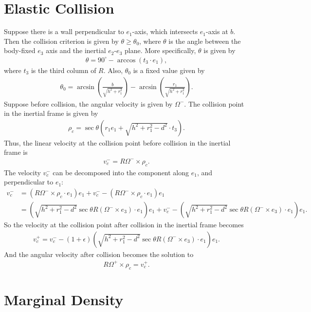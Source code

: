 \documentclass[10pt]{article}
\begin{document}
\section{Elastic Collision}
Suppose there is a wall perpendicular to $e_1$-axis, which intersects $e_1$-axis at $b$.
Then the collision criterion is given by $\theta \geq \theta_0$, where $\theta$ is the angle between the body-fixed $e_3$ axis and the inertial $e_2$-$e_3$ plane.
More specifically, $\theta$ is given by
\begin{align}
	\theta = 90^\circ - \arccos(t_3 \cdot e_1),
\end{align}
where $t_3$ is the third column of $R$.
Also, $\theta_0$ is a fixed value given by
\begin{align}
	\theta_0 = \arcsin\left(\frac{b}{\sqrt{h^2+r_1^2}}\right) - \arcsin\left(\frac{r_1}{\sqrt{h^2+r_1^2}}\right).
\end{align}
Suppose before collision, the angular velocity is given by $\Omega^-$.
The collision point in the inertial frame is given by
\begin{align}
	\rho_c = \sec\theta(r_1e_1 + \sqrt{h^2+r_1^2-d^2} \cdot t_3).
\end{align}
Thus, the linear velocity at the collision point before collision in the inertial frame is
\begin{align}
	v_c^- = R\Omega^- \times \rho_c.
\end{align}
The velocity $v_c^-$ can be decomposed into the component along $e_1$, and perpendicular to $e_1$:
\begin{align}
	v_c^- &= (R\Omega^-\times\rho_c \cdot e_1)e_1 + v_c^- - (R\Omega^-\times\rho_c \cdot e_1)e_1 \nonumber \\
	&= \left(\sqrt{h^2+r_1^2-d^2} \sec\theta R(\Omega^-\times e_3)\cdot e_1\right)e_1 + v_c^- - \left(\sqrt{h^2+r_1^2-d^2} \sec\theta R(\Omega^-\times e_3)\cdot e_1\right)e_1.
\end{align}
So the velocity at the collision point after collision in the inertial frame becomes
\begin{align}
	v_c^+ = v_c^- - (1+\epsilon) \left(\sqrt{h^2+r_1^2-d^2} \sec\theta R(\Omega^-\times e_3)\cdot e_1\right) e_1.
\end{align}
And the angular velocity after collision becomes the solution to
\begin{align}
	R\Omega^+ \times \rho_c = v_c^+.
\end{align}

\section{Marginal Density}
\end{document}
